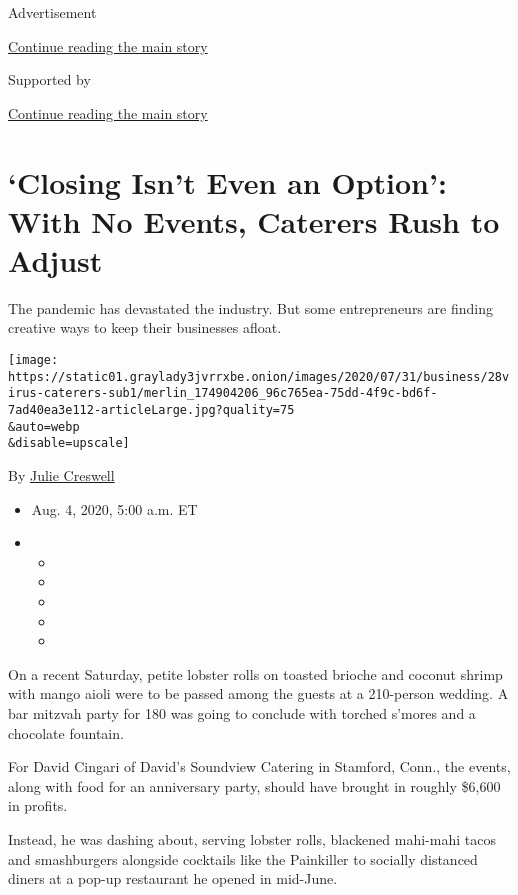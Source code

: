 Advertisement

\protect\hyperlink{after-top}{Continue reading the main story}

Supported by

\protect\hyperlink{after-sponsor}{Continue reading the main story}

\hypertarget{closing-isnt-even-an-option-with-no-events-caterers-rush-to-adjust}{%
\section{`Closing Isn't Even an Option': With No Events, Caterers Rush
to
Adjust}\label{closing-isnt-even-an-option-with-no-events-caterers-rush-to-adjust}}

The pandemic has devastated the industry. But some entrepreneurs are
finding creative ways to keep their businesses afloat.

\texttt{[image: https://static01.graylady3jvrrxbe.onion/images/2020/07/31/business/28virus-caterers-sub1/merlin\_174904206\_96c765ea-75dd-4f9c-bd6f-7ad40ea3e112-articleLarge.jpg?quality=75\\\&auto=webp\\\&disable=upscale]}

By \href{https://www.nytimes3xbfgragh.onion/by/julie-creswell}{Julie
Creswell}

\begin{itemize}
\item
  Aug. 4, 2020, 5:00 a.m. ET
\item
  \begin{itemize}
  \item
  \item
  \item
  \item
  \item
  \end{itemize}
\end{itemize}

On a recent Saturday, petite lobster rolls on toasted brioche and
coconut shrimp with mango aioli were to be passed among the guests at a
210-person wedding. A bar mitzvah party for 180 was going to conclude
with torched s'mores and a chocolate fountain.

For David Cingari of David's Soundview Catering in Stamford, Conn., the
events, along with food for an anniversary party, should have brought in
roughly \$6,600 in profits.

Instead, he was dashing about, serving lobster rolls, blackened
mahi-mahi tacos and smashburgers alongside cocktails like the Painkiller
to socially distanced diners at a pop-up restaurant he opened in
mid-June.

